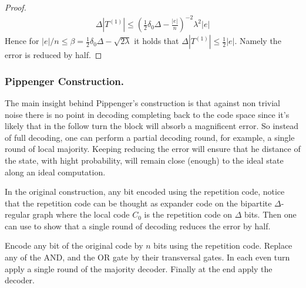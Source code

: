 \documentclass[manuscript,screen,review]{acmart}
\begin{document}
{\begin{proof}
\begin{equation*}
  \begin{split}
    \Delta |T^{(1)}| \le \left( \frac{1}{2} \delta_{0} \Delta - \frac{|e|}{n} \right)^{-2}\lambda^{2} |e|
  \end{split}
\end{equation*}
Hence for $|e|/n \le \beta =  \frac{1}{2} \delta_{0} \Delta - \sqrt{2\lambda}$ it holds that $\Delta|T^{(1)}| \le \frac{1}{2}|e|$. Namely the error is reduced by half.  
\end{proof}

\subsubsection{Pippenger Construction.} The main insight behind Pippenger's construction is that against non trivial noise there is no point in decoding completing back to the code space since it's likely that in the follow turn the block will absorb a magnificent error. So instead of full decoding, one can perform a partial decoding round, for example, a single round of local majority. Keeping reducing the error will ensure that he distance of the state, with hight probability, will remain close (enough) to the ideal state along an ideal computation. 
 
In the original construction, any bit encoded using the repetition code, notice that the repetition code can be thought as expander code on the bipartite $\Delta$-regular graph where the local code $C_{0}$ is the repetition code on $\Delta$ bits. Then one can use  to show that a single round of decoding reduces the error by half.     

Encode any bit of the original code by $n$ bits using the repetition code. Replace any of the AND, and the OR gate by their transversal gates. In each even turn apply a single round of the majority decoder. Finally at the end apply the decoder.  


  \begin{figure}[h]
    \begin{subfigure}[h]{0.05\textwidth}
      \
    \end{subfigure}
    \begin{subfigure}[h]{0.40\textwidth}


\end{subfigure}
\end{figure}}
\end{document}
